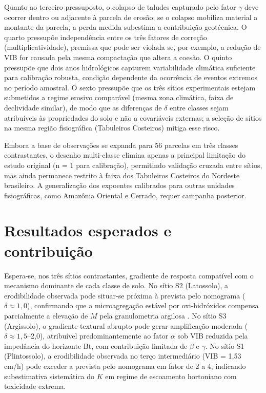 \documentclass[
  brazilian,
  authoryear,
  preprint]{elsarticle}
\begin{document}
Quanto ao terceiro pressuposto, o colapso de taludes capturado pelo
fator \(\gamma\) deve ocorrer dentro ou adjacente à parcela de erosão;
se o colapso mobiliza material a montante da parcela, a perda medida
subestima a contribuição geotécnica. O quarto pressupõe independência
entre os três fatores de correção (multiplicatividade), premissa que
pode ser violada se, por exemplo, a redução de VIB for causada pela
mesma compactação que altera a coesão. O quinto pressupõe que dois anos
hidrológicos capturem variabilidade climática suficiente para calibração
robusta, condição dependente da ocorrência de eventos extremos no
período amostral. O sexto pressupõe que os três sítios experimentais
estejam submetidos a regime erosivo comparável (mesma zona climática,
faixa de declividade similar), de modo que as diferenças de \(\delta\)
entre classes sejam atribuíveis às propriedades do solo e não a
covariáveis externas; a seleção de sítios na mesma região fisiográfica
(Tabuleiros Costeiros) mitiga esse risco.

Embora a base de observações se expanda para 56 parcelas em três classes
contrastantes, o desenho multi-classe elimina apenas a principal
limitação do estudo original (n = 1 para calibração), permitindo
validação cruzada entre sítios, mas ainda permanece restrito à faixa dos
Tabuleiros Costeiros do Nordeste brasileiro. A generalização dos
expoentes calibrados para outras unidades fisiográficas, como Amazônia
Oriental e Cerrado, requer campanha posterior.

\section{Resultados esperados e
contribuição}\label{resultados-esperados-e-contribuiuxe7uxe3o}

Espera-se, nos três sítios contrastantes, gradiente de resposta
compatível com o mecanismo dominante de cada classe de solo. No sítio S2
(Latossolo), a erodibilidade observada pode situar-se próxima à prevista
pelo nomograma (\(\delta \approx 1{,}0\)), confirmando que a
microagregação estável por oxi-hidróxidos compensa parcialmente a
elevação de \(M\) pela granulometria argilosa \citep{silva_et_al_2009}.
No sítio S3 (Argissolo), o gradiente textural abrupto pode gerar
amplificação moderada (\(\delta \approx 1{,}5\)--2,0), atribuível
predominantemente ao fator \(\alpha\) sob VIB reduzida pela impedância
do horizonte Bt, com contribuição limitada de \(\beta\) e \(\gamma\). No
sítio S1 (Plintossolo), a erodibilidade observada no terço intermediário
(VIB = 1,53 cm/h) pode exceder a prevista pelo nomograma em fator de 2 a
4, indicando subestimativa sistemática do \(K\) em regime de escoamento
hortoniano com toxicidade extrema.
\end{document}
